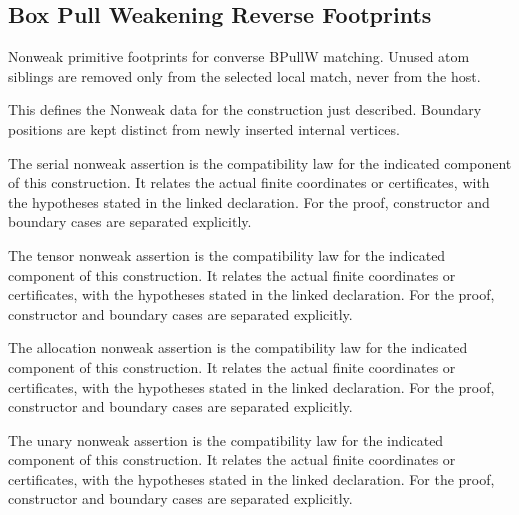 \subsection{Box Pull Weakening Reverse Footprints}
Nonweak primitive footprints for converse BPullW matching. Unused atom siblings are removed only from the selected local match, never from the host.

This defines the Nonweak data for the construction just described. Boundary positions are kept distinct from newly inserted internal vertices.
\par{}

The serial nonweak assertion is the compatibility law for the indicated component of this construction. It relates the actual finite coordinates or certificates, with the hypotheses stated in the linked declaration.
For the proof, constructor and boundary cases are separated explicitly.
\par{}

The tensor nonweak assertion is the compatibility law for the indicated component of this construction. It relates the actual finite coordinates or certificates, with the hypotheses stated in the linked declaration.
For the proof, constructor and boundary cases are separated explicitly.
\par{}

The allocation nonweak assertion is the compatibility law for the indicated component of this construction. It relates the actual finite coordinates or certificates, with the hypotheses stated in the linked declaration.
For the proof, constructor and boundary cases are separated explicitly.
\par{}

The unary nonweak assertion is the compatibility law for the indicated component of this construction. It relates the actual finite coordinates or certificates, with the hypotheses stated in the linked declaration.
For the proof, constructor and boundary cases are separated explicitly.
\par{}

